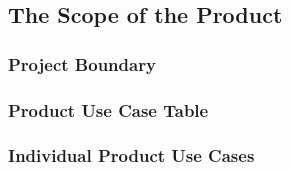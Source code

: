 \documentclass[11pt, oneside]{article}
\begin{document}
\subsection{The Scope of the Product}
\subsubsection{Project Boundary}



\subsubsection{Product Use Case Table}



\subsubsection{Individual Product Use Cases}
\end{document}
